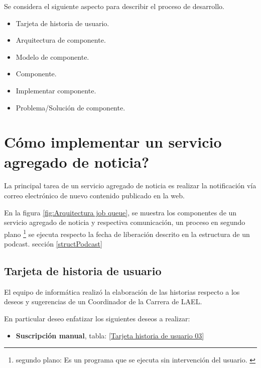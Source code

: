 Se considera el siguiente aspecto para describir el proceso de desarrollo.

\begin{itemize}

\item Tarjeta de historia de usuario.
\item Arquitectura de componente.
\item Modelo de componente.
\item Componente.
\item Implementar componente.
\item Problema/Solución de componente.

\end{itemize}

\section{\textquestiondown Cómo implementar un servicio agregado de noticia?} \label{serviceFeed}

La principal tarea de un servicio agregado de noticia es realizar la
notificación vía correo electrónico de nuevo contenido publicado en la web.

En la figura \ref{fig:Arquitectura job queue}, se muestra los componentes de
un servicio agregado de noticia y respectiva comunicación, un proceso en
segundo plano \footnote{segundo plano: Es un programa que se ejecuta sin
intervención del usuario. \cite{background}} se ejecuta respecto la fecha
de liberación descrito en la estructura de un podcast. sección
\ref{structPodcast}

\begin{minipage}{1.0\textwidth}
	\centering
	\label{fig:Arquitectura job queue}
\end{minipage}

\subsection{Tarjeta de historia de usuario}

El equipo de informática realizó la elaboración de las historias respecto
a los deseos y sugerencias de un Coordinador de la Carrera de LAEL.

En particular deseo enfatizar los siguientes deseos a realizar:

\begin{itemize}

\item \textbf{Suscripción manual}, tabla: \ref{Tarjeta historia de usuario 03}

\end{itemize}

